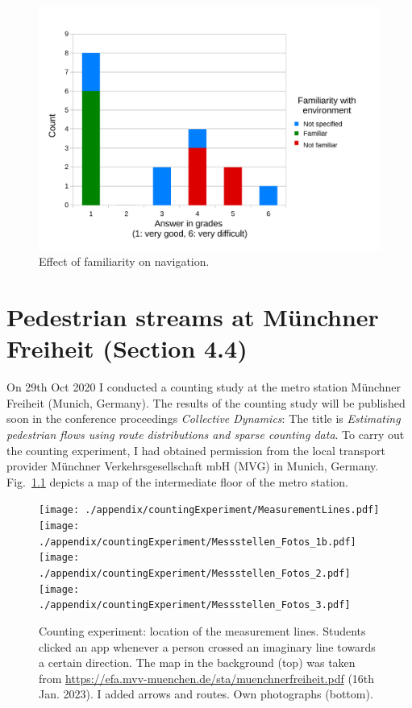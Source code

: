 \begin{figure}[hbt!]
\centering
\includegraphics[width=12cm]{../figures/appendix/resultsonsite.pdf} 
\caption[Effect of familiarity on navigation]{Effect of familiarity on navigation. }
\label{fig:familair}
\end{figure}





\chapter{Pedestrian streams at Münchner Freiheit (Section 4.4)}
\label{sec:countstudy}

On 29th Oct 2020 I conducted a counting study at the metro station Münchner Freiheit (Munich, Germany). The results of the counting study will be published soon in the conference proceedings \textit{Collective Dynamics}: The title is \textit{Estimating pedestrian flows using route distributions and sparse counting data}. 
To carry out the counting experiment, I had obtained permission from the local transport provider Münchner Verkehrsgesellschaft mbH (MVG) in Munich, Germany.  Fig.~\ref{fig:intermediatefloormucfreiheit} depicts a map of the intermediate floor of the metro station.  





\begin{figure}[H]
\texttt{[image: ./appendix/countingExperiment/MeasurementLines.pdf]} 
\texttt{[image: ./appendix/countingExperiment/Messstellen\_Fotos\_1b.pdf]} 
\texttt{[image: ./appendix/countingExperiment/Messstellen\_Fotos\_2.pdf]} 
\texttt{[image: ./appendix/countingExperiment/Messstellen\_Fotos\_3.pdf]} 
\caption[Counting experiment: location of the measurement lines.]{Counting experiment: location of the measurement lines. Students clicked an app whenever a person crossed an imaginary line towards a certain direction. The map in the background (top) was taken from \url{https://efa.mvv-muenchen.de/sta/muenchnerfreiheit.pdf} (16th Jan. 2023). I added arrows and routes. Own photographs (bottom). }
\label{fig:intermediatefloormucfreiheit}
\end{figure}


